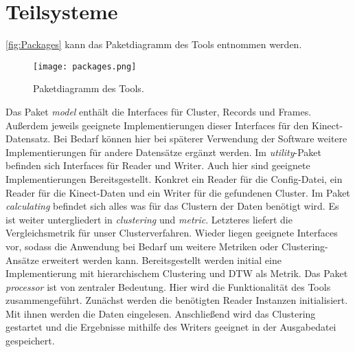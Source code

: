 \section{Teilsysteme}
\label{4-Teilsysteme}
\autoref{fig:Packages} kann das Paketdiagramm des Tools entnommen werden.
\begin{figure}[ht]
    \begin{center}
    \texttt{[image: packages.png]}
    \end{center}
    \caption{Paketdiagramm des Tools.}
    \label{fig:Packages}
\end{figure}
Das Paket \emph{model} enthält die Interfaces für Cluster, Records und Frames.
Außerdem jeweils geeignete Implementierungen dieser Interfaces für den Kinect-Datensatz.
Bei Bedarf können hier bei späterer Verwendung der Software weitere Implementierungen
für andere Datensätze ergänzt werden.
Im \emph{utility}-Paket befinden sich Interfaces für Reader und Writer.
Auch hier sind geeignete Implementierungen Bereitsgestellt.
Konkret ein Reader für die Config-Datei, ein Reader für die Kinect-Daten
und ein Writer für die gefundenen Cluster.
Im Paket \emph{calculating} befindet sich alles was für das Clustern der Daten benötigt wird.
Es ist weiter untergliedert in \emph{clustering} und \emph{metric}.
Letzteres liefert die Vergleichsmetrik für unser Clusterverfahren.
Wieder liegen geeignete Interfaces vor,
sodass die Anwendung bei Bedarf um weitere Metriken oder Clustering-Ansätze erweitert werden kann.
Bereitsgestellt werden initial eine Implementierung mit hierarchischem Clustering
und \ac{DTW} als Metrik.
Das Paket \emph{processor} ist von zentraler Bedeutung.
Hier wird die Funktionalität des Tools zusammengeführt.
Zunächst werden die benötigten Reader Instanzen initialisiert.
Mit ihnen werden die Daten eingelesen.
Anschließend wird das Clustering gestartet und die Ergebnisse mithilfe des Writers
geeignet in der Ausgabedatei gespeichert.